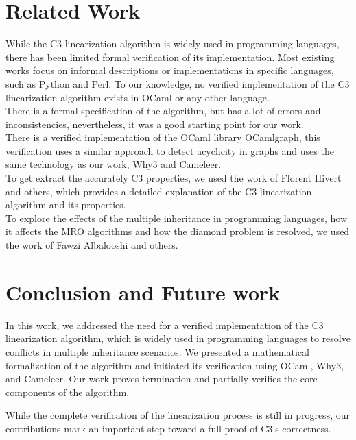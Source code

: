 \documentclass[runningheads]{llncs}
\begin{document}
\section{Related Work}
\label{sec:related-work}
While the C3 linearization algorithm is widely used in programming languages, 
there has been limited formal verification of its implementation.
Most existing works focus on informal descriptions or implementations in specific languages, such as Python\autocite{Python23Method} and Perl\autocite{MroMethodResolution}.
To our knowledge, no verified implementation of the C3 linearization algorithm exists in OCaml or any other language.\\
There is a formal specification of the algorithm\cite{reisSoliderSolidity2023}, but has a lot of errors and inconsistencies, nevertheless, it was a good starting point for our work.\\
There is a verified implementation\cite{castanhoAutoactiveVerificationGraph2022} of the OCaml library OCamlgraph\cite{filliatreBacktrackingOcamlgraph2025}, 
this verification uses a similar approach to detect acyclicity in graphs and uses the same technology as our work, Why3 and Cameleer.\\
To get extract the accurately C3 properties, we used the work of Florent Hivert and  others\autocite{hivertControllingC3Super2024}, which provides a detailed explanation of the C3 linearization algorithm and its properties.\\
To explore the effects of the multiple inheritance in programming languages, how it affects the MRO algorithms and how the diamond problem is resolved, we used the work of Fawzi Albalooshi and others\autocite{albalooshiComparativeStudyEffect2017}.

\section{Conclusion and Future work}
\label{sec:conclusion-future}
In this work, we addressed the need for a verified implementation of the C3 linearization algorithm, which is widely used in programming languages to resolve conflicts in multiple inheritance scenarios. 
We presented a mathematical formalization of the algorithm and initiated its verification using OCaml, Why3, and Cameleer. Our work proves termination and partially verifies the core components of the algorithm.

While the complete verification of the linearization process is still in progress, our contributions mark an important step toward a full proof of C3's correctness.
\end{document}
